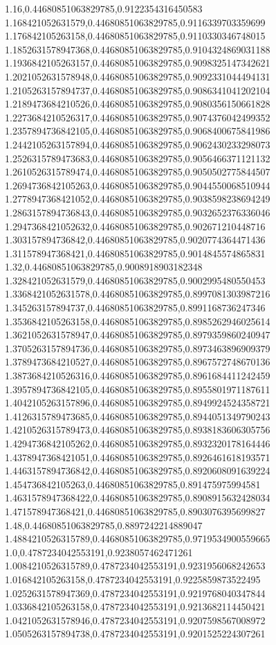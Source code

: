 1.16,0.44680851063829785,0.9122354316450583
1.168421052631579,0.44680851063829785,0.9116339703359699
1.176842105263158,0.44680851063829785,0.9110330346748015
1.1852631578947368,0.44680851063829785,0.9104324869031188
1.1936842105263157,0.44680851063829785,0.9098325147342621
1.2021052631578948,0.44680851063829785,0.9092331044494131
1.2105263157894737,0.44680851063829785,0.9086341041202104
1.2189473684210526,0.44680851063829785,0.9080356150661828
1.2273684210526317,0.44680851063829785,0.9074376042499352
1.2357894736842105,0.44680851063829785,0.9068400675841986
1.2442105263157894,0.44680851063829785,0.9062430233298073
1.2526315789473683,0.44680851063829785,0.9056466371121132
1.2610526315789474,0.44680851063829785,0.9050502775844507
1.2694736842105263,0.44680851063829785,0.9044550068510944
1.2778947368421052,0.44680851063829785,0.9038598238694249
1.2863157894736843,0.44680851063829785,0.9032652376336046
1.2947368421052632,0.44680851063829785,0.902671210448716
1.303157894736842,0.44680851063829785,0.9020774364471436
1.311578947368421,0.44680851063829785,0.9014845574865831
1.32,0.44680851063829785,0.9008918903182348
1.328421052631579,0.44680851063829785,0.9002995480550453
1.3368421052631578,0.44680851063829785,0.8997081303987216
1.345263157894737,0.44680851063829785,0.8991168736247346
1.3536842105263158,0.44680851063829785,0.8985262946025614
1.3621052631578947,0.44680851063829785,0.8979359860240947
1.3705263157894736,0.44680851063829785,0.8973463896909379
1.3789473684210527,0.44680851063829785,0.8967572748670136
1.3873684210526316,0.44680851063829785,0.8961684411242459
1.3957894736842105,0.44680851063829785,0.8955801971187611
1.4042105263157896,0.44680851063829785,0.8949924524358721
1.4126315789473685,0.44680851063829785,0.8944051349790243
1.4210526315789473,0.44680851063829785,0.8938183606305756
1.4294736842105262,0.44680851063829785,0.8932320178164446
1.4378947368421051,0.44680851063829785,0.8926461618193571
1.4463157894736842,0.44680851063829785,0.8920608091639224
1.454736842105263,0.44680851063829785,0.891475975994581
1.4631578947368422,0.44680851063829785,0.8908915632428034
1.471578947368421,0.44680851063829785,0.8903076395699827
1.48,0.44680851063829785,0.8897242214889047
1.4884210526315789,0.44680851063829785,0.9719534900559665
1.0,0.4787234042553191,0.9238057462471261
1.0084210526315789,0.4787234042553191,0.9231956068242653
1.016842105263158,0.4787234042553191,0.9225859873522495
1.0252631578947369,0.4787234042553191,0.9219768040347844
1.0336842105263158,0.4787234042553191,0.9213682114450421
1.0421052631578946,0.4787234042553191,0.9207598567008972
1.0505263157894738,0.4787234042553191,0.9201525224307261
